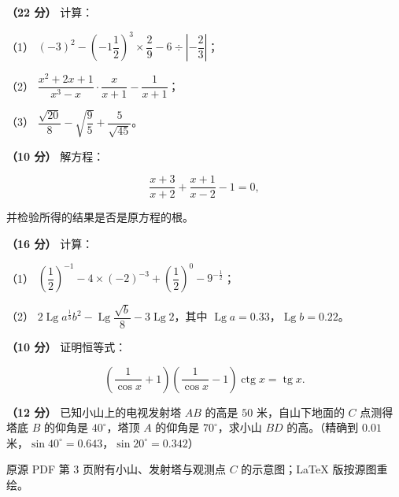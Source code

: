 \begin{question}
\textbf{（22 分）} 计算：

（1） $(-3)^2-\left(-1\dfrac{1}{2}\right)^3\times\dfrac{2}{9}-6\div\left|-\dfrac{2}{3}\right|$；

（2） $\dfrac{x^2+2x+1}{x^3-x}\cdot\dfrac{x}{x+1}-\dfrac{1}{x+1}$；

（3） $\dfrac{\sqrt{20}}{8}-\sqrt{\dfrac{9}{5}}+\dfrac{5}{\sqrt{45}}$。

\end{question}
\begin{question}
\textbf{（10 分）} 解方程：

\nopagebreak[4]
\[
\frac{x+3}{x+2}+\frac{x+1}{x-2}-1=0,
\]

并检验所得的结果是否是原方程的根。

\end{question}
\begin{question}
\textbf{（16 分）} 计算：

（1） $\left(\dfrac{1}{2}\right)^{-1}-4\times(-2)^{-3}+\left(\dfrac{1}{2}\right)^{0}-9^{-\frac{1}{2}}$；

（2） $2\operatorname{Lg}a^{\frac{1}{3}}b^{2}-\operatorname{Lg}\dfrac{\sqrt{b}}{8}-3\operatorname{Lg}2$，其中 $\operatorname{Lg}a=0.33$，$\operatorname{Lg}b=0.22$。

\end{question}
\begin{question}
\textbf{（10 分）} 证明恒等式：

\nopagebreak[4]
\[
\left(\frac{1}{\cos x}+1\right)\left(\frac{1}{\cos x}-1\right)\operatorname{ctg}x=\operatorname{tg}x.
\]

\Needspace{0.4\textheight}
\end{question}
\begin{question}
\textbf{（12 分）} 已知小山上的电视发射塔 $AB$ 的高是 $50$ 米，自山下地面的 $C$ 点测得塔底 $B$ 的仰角是 $40^\circ$，塔顶 $A$ 的仰角是 $70^\circ$，求小山 $BD$ 的高。（精确到 $0.01$ 米，$\sin40^\circ=0.643$，$\sin20^\circ=0.342$）

\begin{gktip}
原源 PDF 第 3 页附有小山、发射塔与观测点 $C$ 的示意图；LaTeX 版按源图重绘。
\end{gktip}
\nopagebreak[4]
\begin{center}\end{center}
\nopagebreak[4]
\Needspace{0.4\textheight}
\end{question}
